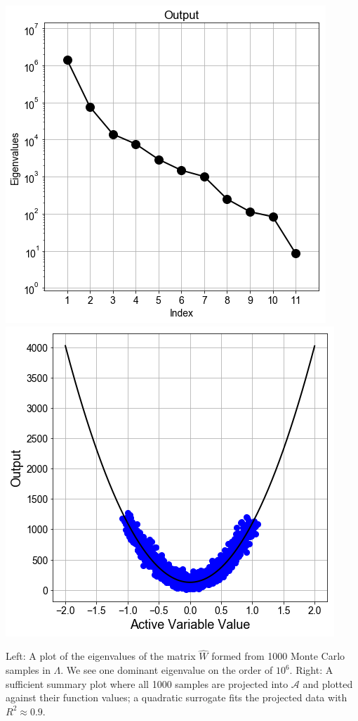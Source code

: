 \documentclass[11pt]{beamer}
\newcommand{\A}{\mathcal{A}}
\begin{document}
\begin{frame}

\begin{center}

 
\includegraphics[scale=0.3]{eigs.png} \includegraphics[scale=0.3]{surr.png}

Left: A plot of the eigenvalues of the matrix $\hat{W}$ formed from 1000 Monte Carlo samples in $\Lambda$. We see one dominant eigenvalue on the order of $10^6$. Right: A sufficient summary plot where all 1000 samples are projected into $\A$ and plotted against their function values; a quadratic surrogate fits the projected data with $R^2\approx 0.9$.

\end{center}



\end{frame}
\end{document}
